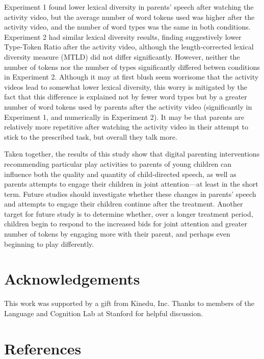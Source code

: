 \documentclass[man,floatsintext]{apa6}
\begin{document}
Experiment 1 found lower lexical diversity in parents' speech after watching the activity video, but the average number of word tokens used was higher after the activity video, and the number of word types was the same in both conditions.
Experiment 2 had similar lexical diversity results, finding suggestively lower Type-Token Ratio after the activity video, although the length-corrected lexical diversity measure (MTLD) did not differ significantly.
However, neither the number of tokens nor the number of types significantly differed betwen conditions in Experiment 2.
Although it may at first blush seem worrisome that the activity videos lead to somewhat lower lexical diversity, this worry is mitigated by the fact that this difference is explained not by fewer word types but by a greater number of word tokens used by parents after the activity video (significantly in Experiment 1, and numerically in Experiment 2).
It may be that parents are relatively more repetitive after watching the activity video in their attempt to stick to the prescribed task, but overall they talk more.

Taken together, the results of this study show that digital parenting interventions recommending particular play activities to parents of young children can influence both the quality and quantity of child-directed speech, as well as parents attempts to engage their children in joint attention---at least in the short term.
Future studies should investigate whether these changes in parents' speech and attempts to engage their children continue after the treatment.
Another target for future study is to determine whether, over a longer treatment period, children begin to respond to the increased bids for joint attention and greater number of tokens by engaging more with their parent, and perhaps even beginning to play differently.

\hypertarget{acknowledgements}{%
\section{Acknowledgements}\label{acknowledgements}}

This work was supported by a gift from Kinedu, Inc.
Thanks to members of the Language and Cognition Lab at Stanford for helpful discussion.

\newpage

\hypertarget{references}{%
\section{References}\label{references}}
\end{document}

